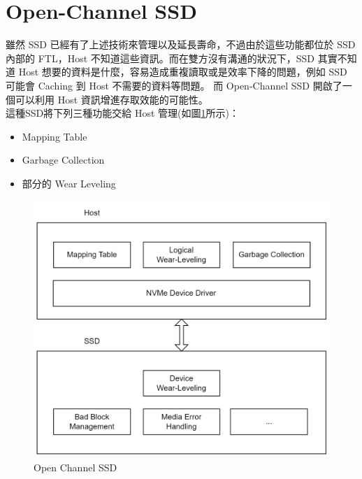\section{Open-Channel SSD}\label{s2.3}
\indent
雖然 SSD 已經有了上述技術來管理以及延長壽命，不過由於這些功能都位於 SSD 內部的 FTL，Host 不知道這些資訊。而在雙方沒有溝通的狀況下，SSD 其實不知道 Host 想要的資料是什麼，容易造成重複讀取或是效率下降的問題，例如 SSD 可能會 Caching 到 Host 不需要的資料等問題。
而 Open-Channel SSD 開啟了一個可以利用 Host 資訊增進存取效能的可能性。\\
這種SSD將下列三種功能交給 Host 管理(如圖\ref{f2.8}所示)：
\begin{itemize}
    \item Mapping Table
    \item Garbage Collection
    \item 部分的 Wear Leveling
\end{itemize}
\begin{figure}[H]
    \centering
    \includegraphics[width=1\textwidth]{picture/ch2/OPSSD.png}
    \caption{Open Channel SSD\cite{OPSSD}}
    \label{f2.8}
\end{figure}


